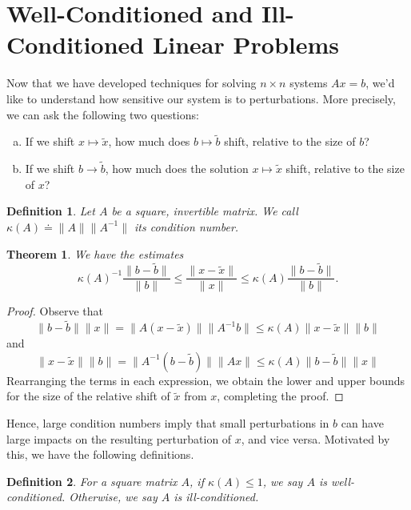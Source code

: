 \documentclass[12pt,reqno]{amsart}
\numberwithin{equation}{section}  %
\newtheorem{theorem}{Theorem}
\newtheorem*{definition}{Definition}
\begin{document}
\section{Well-Conditioned and Ill-Conditioned Linear Problems}
Now that we have developed techniques for solving $n \times n$
systems $Ax = b$, we'd like to understand how sensitive our system
is to perturbations. More precisely, we can ask the following two questions:
\begin{enumerate}[a)]
\item If we shift $x \mapsto \tilde{x}$, how much does $b \mapsto 
\tilde{b}$ shift, relative to the size of $b$?
\item If we shift $b \to \tilde{b}$, how much does the solution $x \mapsto
\tilde{x}$ shift, relative to the size of $x$?
\end{enumerate}
\begin{definition}
Let $A$ be a square, invertible matrix. We call $\kappa(A) \doteq \| A \| \| A^{-1} \|$
its \emph{condition number}.
\end{definition}
\begin{theorem}
We have the estimates
\begin{equation*}
\kappa(A)^{-1} \frac{\| b - \tilde{b}\|}{\| b\|} \le \frac{\| x - \tilde{x} \|}{\| x \|}
\le \kappa(A) \frac{ \| b - \tilde{b} \|}{ \| b \| }.
\end{equation*}
\end{theorem}
\begin{proof}
Observe that
\begin{equation*}
\| b - \tilde{b} \| \| x \| = \| A(x - \tilde{x})\| \| A^{-1}b \| 
\le \kappa(A) \| x - \tilde{x} \| \| b \|
\end{equation*}
and
\begin{equation*}
\| x - \tilde{x} \| \| b \| = \| A^{-1}(b - \tilde{b})\| \| Ax \| 
\le \kappa(A) \| b - \tilde{b} \| \| x \|
\end{equation*}
Rearranging the terms in each expression, we obtain the lower and upper
bounds for the size of the relative shift of $\tilde{x}$ from $x$, completing
the proof.
\end{proof}
Hence, large condition numbers imply that small perturbations in $b$ can have
large impacts on the resulting perturbation of $x$, and vice versa.
Motivated by this, we have the following definitions.
\begin{definition}
For a square matrix $A$, if $\kappa(A) \le 1$, we say $A$ is well-conditioned.
Otherwise, we say $A$ is ill-conditioned.
\end{definition}
\end{document}
